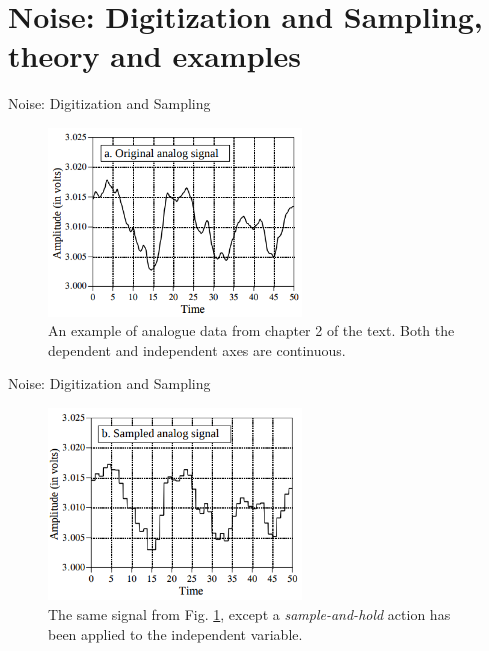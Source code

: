 \documentclass{beamer}
\begin{document}
\section{Noise: Digitization and Sampling, theory and examples}

\begin{frame}[fragile]{Noise: Digitization and Sampling}
\begin{figure}
\centering
\includegraphics[width=0.6\textwidth]{figures/adc_dac1.png}
\caption{\label{fig:adc1} An example of analogue data from chapter 2 of the text.  Both the dependent and independent axes are continuous.}
\end{figure}
\end{frame}

\begin{frame}[fragile]{Noise: Digitization and Sampling}
\begin{figure}
\centering
\includegraphics[width=0.6\textwidth]{figures/adc_dac2.png}
\caption{\label{fig:adc2} The same signal from Fig. \ref{fig:adc1}, except a \textit{sample-and-hold} action has been applied to the independent variable.}
\end{figure}
\end{frame}
\end{document}
